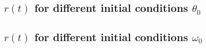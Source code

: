 \documentclass[10pt,a4paper]{article}
\begin{document}
\subsection{$r(t)$ for different initial conditions $\theta_0$}






















\subsection{$r(t)$ for different initial conditions $\omega_0$}
\end{document}
